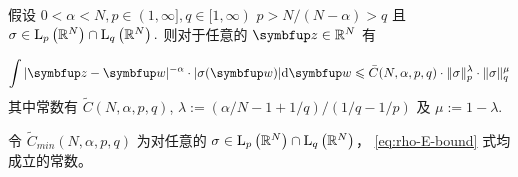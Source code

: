 \begin{lemma}
    \label{lem:sigma-influence}
    假设 $0<\alpha<N, p \in( 1, \infty], q \in[1, \infty)$ $p>N /(N-\alpha)>q $ 且 $\sigma \in \mathrm{L}_{p}\left({\mathbb{R}}^{N}\right) \cap \mathrm{L}_{q}\left({\mathbb{R}}^{N}\right) .$ 则对于任意的 $\vect{z} \in \bbR^{N}$ 有

    \begin{equation}
        \label{eq:rho-E-bound}
        \int|\vect{z}-\vect{w}|^{-\alpha} \cdot|\sigma(\vect{w})| \mathrm{d} \vect{w} \leqslant \bar{C}(N, \alpha, p, q) \cdot\|\sigma\|_{p}^{\lambda} \cdot \|\sigma\|_{q} ^{\mu}
    \end{equation}
其中常数有 $\tilde{C}(N, \alpha, p, q)$,   $\lambda:=(\alpha / N-1+1 / q) /(1 / q-1 / p)$ 及 $\mu:=1-\lambda $. 

令 $\tilde{C}_{min}(N, \alpha, p, q)$ 为对任意的 $\sigma \in \mathrm{L}_{p}\left({\mathbb{R}}^{N}\right) \cap \mathrm{L}_{q}\left({\mathbb{R}}^{N}\right)$， \eqref{eq:rho-E-bound} 式均成立的常数。 
\end{lemma}

